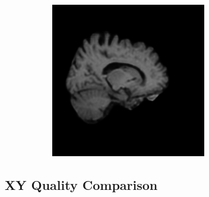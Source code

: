 \documentclass[12pt, fleqn, titlepage]{article}
\newcommand\skipperer{0.45pt}
\begin{document}
\begin{figure}[H]
\begin{subfigure}[b]{0.7\textwidth}
		\hskip\skipperer
		\includegraphics[width=0.15\linewidth]{imgs/3T_no_noise}
	\end{subfigure}
\end{figure}

\subsection{XY Quality Comparison}\label{xy_generated}
\end{document}
